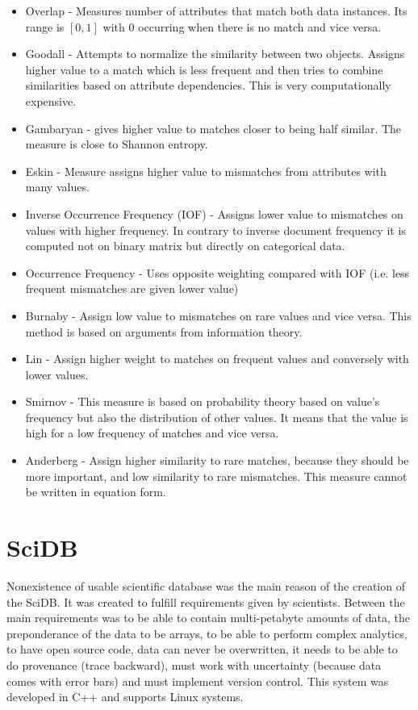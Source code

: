 \begin{itemize}
\item Overlap - Measures number of attributes that match both data instances. Its range is $[0,1]$ with 0 occurring when there is no match and vice versa.
\item Goodall - Attempts to normalize the similarity between two objects. Assigns higher value to a match which is less frequent and then tries to combine similarities based on attribute dependencies. This is very computationally expensive.
\item Gambaryan - gives higher value to matches closer to being half similar. The measure is close to Shannon entropy. 
\item Eskin - Measure assigns higher value to mismatches from attributes with many values.
\item Inverse Occurrence Frequency (IOF) - Assigns lower value to mismatches on values with higher frequency. In contrary to inverse document frequency it is computed not on binary matrix but directly on categorical data.
\item Occurrence Frequency - Uses opposite weighting compared with IOF (i.e. less frequent mismatches are given lower value)
\item Burnaby - Assign low value to mismatches on rare values and vice versa. This method is based on arguments from information theory.
\item Lin - Assign higher weight to matches on frequent values and conversely with lower values.
\item Smirnov - This measure is based on probability theory based on value's frequency but also the distribution of other values. It means that the value is high for a low frequency of matches and vice versa.
\item Anderberg - Assign higher similarity to rare matches, because they should be more important, and low similarity to rare mismatches. This measure cannot be written in equation form.

\end{itemize}


\section{SciDB}\label{scidb}
Nonexistence of usable scientific database was the main reason of the creation of the SciDB. It was created to fulfill requirements given by scientists. Between the main requirements was to be able to contain multi-petabyte amounts of data, the preponderance of the data to be arrays, to be able to perform complex analytics, to have open source code, data can never be overwritten, it needs to be able to do provenance (trace backward), must work with uncertainty (because data comes with error bars) and must implement version control. This system was developed in C++ and supports Linux systems.


